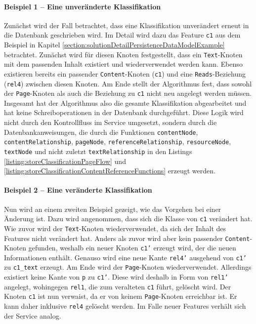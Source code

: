     \paragraph{Beispiel 1 -- Eine unveränderte Klassifikation}
    Zunächst wird der Fall betrachtet, dass eine Klassifikation unverändert erneut in die Datenbank geschrieben wird.
    Im Detail wird dazu das Feature \texttt{c1} aus dem Beispiel in Kapitel
    \ref{section:solutionDetailPersistenceDataModelExample} betrachtet.
    Zunächst wird für diesen Knoten festgestellt,
    dass ein \texttt{Text}-Knoten mit dem passenden Inhalt existiert und wiederverwendet werden kann.
    Ebenso existieren bereits ein passender \texttt{Content}-Knoten (\texttt{c1}) und eine \texttt{Reads}-Beziehung (\texttt{rel4}) zwischen diesen Knoten.
    Am Ende stellt der Algorithmus fest, dass sowohl der \texttt{Page}-Knoten als auch
    die Beziehung zu \texttt{c1} nicht neu angelegt werden müssen.
    Insgesamt hat der Algorithmus also die gesamte Klassifikation abgearbeitet
    und hat keine Schreiboperationen in der Datenbank durchgeführt.
    Diese Logik wird nicht durch den Kontrollfluss im Service umgesetzt,
    sondern durch die Datenbankanweisungen, die durch die Funktionen
    \texttt{contentNode},
    \texttt{contentRelationship},
    \texttt{pageNode},
    \texttt{referenceRelationship},
    \texttt{resourceNode},
    \texttt{textNode} und nicht zuletzt
    \texttt{textRelationship} in den Listings
    \ref{listing:storeClassificationPageFlow} und
    \ref{listing:storeClassificationContentReferenceFunctions}
    erzeugt werden.

    \paragraph{Beispiel 2 -- Eine veränderte Klassifikation}
    Nun wird an einem zweiten Beispiel gezeigt,
    wie das Vorgehen bei einer Änderung ist.
    Dazu wird angenommen, dass sich die Klasse von \texttt{c1} verändert hat.
    Wie zuvor wird der \texttt{Text}-Knoten wiederverwendet,
    da sich der Inhalt des Features nicht verändert hat.
    Anders als zuvor wird aber kein passender \texttt{Content}-Knoten gefunden,
    weshalb ein neuer Knoten \texttt{c1'} erzeugt wird, der die neuen Informationen enthält.
    Genauso wird eine neue Kante \texttt{rel4'} ausgehend von \texttt{c1'} zu \texttt{c1\_text} erzeugt.
    Am Ende wird der \texttt{Page}-Knoten wiederverwendet.
    Allerdings existiert keine Kante von \texttt{p} zu \texttt{c1'}.
    Diese wird deshalb in Form von \texttt{rel1'} angelegt,
    wohingegen \texttt{rel1}, die zum veralteten \texttt{c1} führt, gelöscht wird.
    Der Knoten \texttt{c1} ist nun verwaist, da er von keinem \texttt{Page}-Knoten erreichbar ist.
    Er kann daher inklusive \texttt{rel4} gelöscht werden.
    Im Falle neuer Features verhält sich der Service analog.

